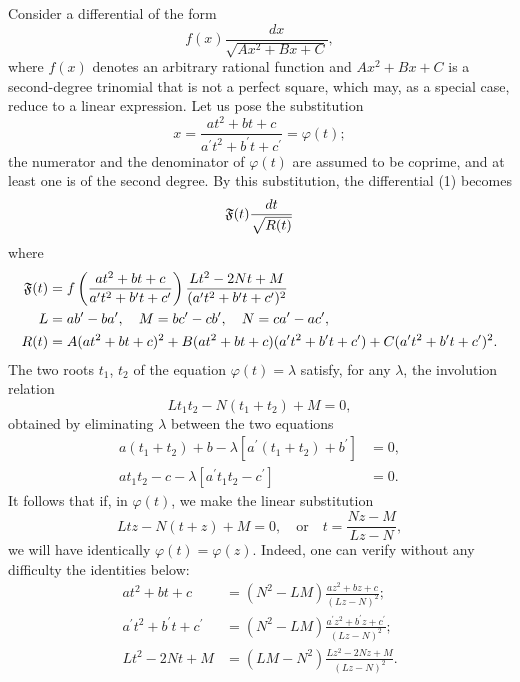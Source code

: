 \documentclass[11pt]{article}
\begin{document}
Consider a differential of the form
\begin{equation}
f(x)\frac{dx}{\sqrt{Ax^{2}+Bx+C}},
\end{equation}
where $f(x)$ denotes an arbitrary rational function and $Ax^{2}+Bx+C$ is a second-degree trinomial that is not a perfect square, which may, as a special case, reduce to a linear expression. Let us pose the substitution
\begin{equation}
x=\frac{at^{2}+bt+c}{a^{\prime}t^{2}+b^{\prime}t+c^{\prime}}=\varphi(t);
\end{equation}
the numerator and the denominator of $\varphi(t)$ are assumed to be coprime, and at least one is of the second degree. By this substitution, the differential (1) becomes
\begin{equation}
\mathfrak{F}(t)\frac{dt}{\sqrt{R(t)}}
\end{equation}
where
\begin{align*}
\mathfrak{F}(t) &= f\left(\frac{at^{2}+bt+c}{a^{\prime}t^{2}+b^{\prime}t+c^{\prime}}\right)\frac{Lt^{2}-2Nt+M}{(a^{\prime}t^{2}+b^{\prime}t+c^{\prime})^{2}} \\
L &= ab^{\prime}-ba^{\prime}, \quad M=bc^{\prime}-cb^{\prime}, \quad N=ca^{\prime}-ac^{\prime}, \\
R(t) &= A(at^{2}+bt+c)^{2}+B(at^{2}+bt+c)(a^{\prime}t^{2}+b^{\prime}t+c^{\prime})+C(a^{\prime}t^{2}+b^{\prime}t+c^{\prime})^{2}.
\end{align*}
The two roots $t_{1}$, $t_{2}$ of the equation $\varphi(t)=\lambda$ satisfy, for any $\lambda$, the involution relation
\begin{equation*}
L t_{1}t_{2}-N(t_{1}+t_{2})+M=0,
\end{equation*}
obtained by eliminating $\lambda$ between the two equations
\begin{align*}
a(t_{1}+t_{2})+b-\lambda[a^{\prime}(t_{1}+t_{2})+b^{\prime}] &= 0, \\
at_{1}t_{2}-c-\lambda[a^{\prime}t_{1}t_{2}-c^{\prime}] &= 0.
\end{align*}
It follows that if, in $\varphi(t)$, we make the linear substitution
\begin{equation}
Ltz - N(t+z) + M = 0, \quad \text{or} \quad t = \frac{Nz-M}{Lz-N},
\end{equation}
we will have identically $\varphi(t)=\varphi(z)$. Indeed, one can verify without any difficulty the identities below:
\begin{align*}
at^{2}+bt+c &= (N^{2}-LM)\frac{az^{2}+bz+c}{(Lz-N)^{2}}; \\
a^{\prime}t^{2}+b^{\prime}t+c^{\prime} &= (N^{2}-LM)\frac{a^{\prime}z^{2}+b^{\prime}z+c^{\prime}}{(Lz-N)^{2}}; \\
Lt^{2}-2Nt+M &= (LM-N^{2})\frac{Lz^{2}-2Nz+M}{(Lz-N)^{2}}.
\end{align*}
\end{document}

